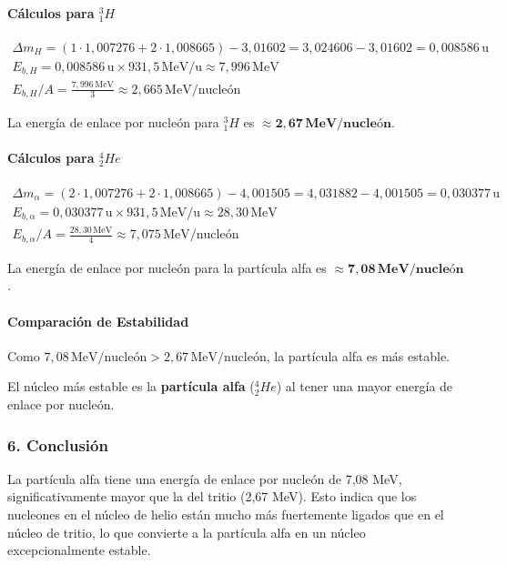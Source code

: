 \paragraph*{Cálculos para ${}_{1}^{3}H$}
\begin{gather}
    \Delta m_H = (1 \cdot 1,007276 + 2 \cdot 1,008665) - 3,01602 = 3,024606 - 3,01602 = 0,008586 \, \text{u} \\
    E_{b,H} = 0,008586\,\text{u} \times 931,5\,\text{MeV/u} \approx 7,996 \, \text{MeV} \\
    E_{b,H}/A = \frac{7,996 \, \text{MeV}}{3} \approx 2,665 \, \text{MeV/nucleón}
\end{gather}
\begin{cajaresultado}
La energía de enlace por nucleón para ${}_{1}^{3}H$ es $\boldsymbol{\approx 2,67 \, \textbf{MeV/nucleón}}$.
\end{cajaresultado}
\paragraph*{Cálculos para ${}_{2}^{4}He$}
\begin{gather}
    \Delta m_\alpha = (2 \cdot 1,007276 + 2 \cdot 1,008665) - 4,001505 = 4,031882 - 4,001505 = 0,030377 \, \text{u} \\
    E_{b,\alpha} = 0,030377\,\text{u} \times 931,5\,\text{MeV/u} \approx 28,30 \, \text{MeV} \\
    E_{b,\alpha}/A = \frac{28,30 \, \text{MeV}}{4} \approx 7,075 \, \text{MeV/nucleón}
\end{gather}
\begin{cajaresultado}
La energía de enlace por nucleón para la partícula alfa es $\boldsymbol{\approx 7,08 \, \textbf{MeV/nucleón}}$.
\end{cajaresultado}
\paragraph*{Comparación de Estabilidad}
Como $7,08 \, \text{MeV/nucleón} > 2,67 \, \text{MeV/nucleón}$, la partícula alfa es más estable.
\begin{cajaresultado}
El núcleo más estable es la \textbf{partícula alfa} (${}_{2}^{4}He$) al tener una mayor energía de enlace por nucleón.
\end{cajaresultado}

\subsubsection*{6. Conclusión}
\begin{cajaconclusion}
La partícula alfa tiene una energía de enlace por nucleón de 7,08 MeV, significativamente mayor que la del tritio (2,67 MeV). Esto indica que los nucleones en el núcleo de helio están mucho más fuertemente ligados que en el núcleo de tritio, lo que convierte a la partícula alfa en un núcleo excepcionalmente estable.
\end{cajaconclusion}

